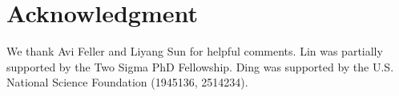 \documentclass[11pt]{article}
\def\cI{{\mathcal I}}
\newcommand{\htau}{\widehat\tau}
\numberwithin{equation}{section}
\theoremstyle{definition}
\begin{document}


\section*{Acknowledgment}

We thank Avi Feller and Liyang Sun for helpful comments. Lin was partially supported by the Two Sigma PhD Fellowship. Ding was supported by the U.S. National Science Foundation (1945136, 2514234).
\end{document}
